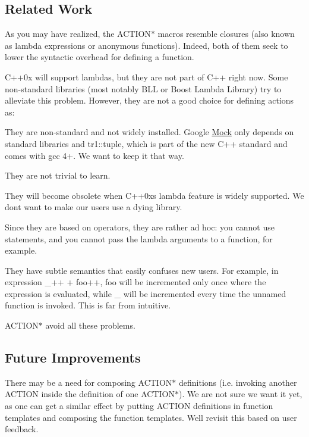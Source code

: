 \subsection*{Related Work}

As you may have realized, the {\ttfamily A\+C\+T\+I\+O\+N$\ast$} macros resemble closures (also known as lambda expressions or anonymous functions). Indeed, both of them seek to lower the syntactic overhead for defining a function.

C++0x will support lambdas, but they are not part of C++ right now. Some non-\/standard libraries (most notably B\+LL or Boost Lambda Library) try to alleviate this problem. However, they are not a good choice for defining actions as\+:


\begin{DoxyItemize}
\item They are non-\/standard and not widely installed. Google \mbox{\hyperlink{classMock}{Mock}} only depends on standard libraries and {\ttfamily tr1\+::tuple}, which is part of the new C++ standard and comes with gcc 4+. We want to keep it that way.
\item They are not trivial to learn.
\item They will become obsolete when C++0x\textquotesingle{}s lambda feature is widely supported. We don\textquotesingle{}t want to make our users use a dying library.
\item Since they are based on operators, they are rather ad hoc\+: you cannot use statements, and you cannot pass the lambda arguments to a function, for example.
\item They have subtle semantics that easily confuses new users. For example, in expression {\ttfamily \+\_++ + foo++}, {\ttfamily foo} will be incremented only once where the expression is evaluated, while {\ttfamily \+\_} will be incremented every time the unnamed function is invoked. This is far from intuitive.
\end{DoxyItemize}

{\ttfamily A\+C\+T\+I\+O\+N$\ast$} avoid all these problems.

\subsection*{Future Improvements}

There may be a need for composing {\ttfamily A\+C\+T\+I\+O\+N$\ast$} definitions (i.\+e. invoking another {\ttfamily A\+C\+T\+I\+ON} inside the definition of one {\ttfamily A\+C\+T\+I\+O\+N$\ast$}). We are not sure we want it yet, as one can get a similar effect by putting {\ttfamily A\+C\+T\+I\+ON} definitions in function templates and composing the function templates. We\textquotesingle{}ll revisit this based on user feedback.


